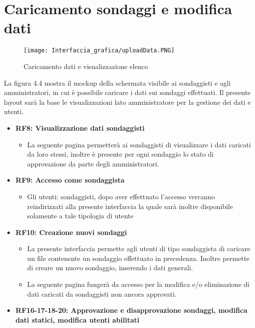 \section{Caricamento sondaggi e modifica dati}
    \label{fig:4.4}
    \begin{figure}[H]
        \center
        \texttt{[image: Interfaccia\_grafica/uploadData.PNG]}
        \caption{Caricamento dati e visualizzazione elenco}
    \end{figure} 
    La figura 4.4 mostra il mockup della schermata visibile ai sondaggisti e agli amministratori, in cui è possibile caricare i dati sui sondaggi effettuati.\newline
    Il presente layout sarà la base le visualizzazioni lato amministratore per la gestione dei dati e utenti.
    \begin{itemize}
        \item \textbf{RF8: Visualizzazione dati sondaggisti} \begin{itemize}
            \item La seguente pagina permetterà ai sondaggisti di visualizzare i dati caricati da loro stessi, inoltre è presente per ogni sondaggio lo stato di approvazione da parte degli amministratori.
        \end{itemize}
        \item \textbf{RF9: Accesso come sondaggista} \begin{itemize}
            \item Gli utenti: sondaggisti, dopo aver effettuato l'accesso verranno reindirizzati alla presente interfaccia la quale sarà inoltre disponibile solamente a tale tipologia di utente
        \end{itemize}
        \item \textbf{RF10: Creazione nuovi sondaggi} \begin{itemize}
            \item La presente interfaccia permette agli utenti di tipo sondaggista di caricare un file contenente un sondaggio effettuato in precedenza. Inoltre permette di creare un nuovo sondaggio, inserendo i dati generali.
            \item La seguente pagina fungerà da accesso per la modifica e/o eliminazione di dati caricati da sondaggisti non ancora approvati.
        \end{itemize}
        \item \textbf{RF16-17-18-20: Approvazione e disapprovazione sondaggi, modifica dati statici, modifica utenti abilitati} \begin{itemize}

\end{itemize}
\end{itemize}
